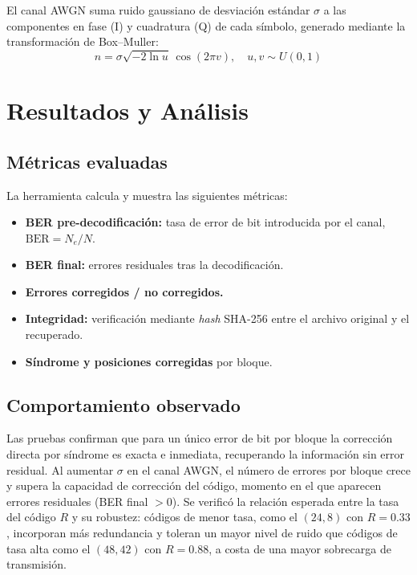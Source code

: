 \documentclass[conference]{IEEEtran}
\begin{document}
El canal AWGN suma ruido gaussiano de desviación estándar $\sigma$ a las componentes en fase (I) y cuadratura (Q) de cada símbolo, generado mediante la transformación de Box--Muller:
\begin{equation}
n = \sigma \sqrt{-2\ln u}\,\cos(2\pi v), \quad u,v \sim U(0,1)
\end{equation}

\section{Resultados y Análisis}

\subsection{Métricas evaluadas}
La herramienta calcula y muestra las siguientes métricas:
\begin{itemize}
  \item \textbf{BER pre-decodificación:} tasa de error de bit introducida por el canal, $\text{BER} = N_e / N$.
  \item \textbf{BER final:} errores residuales tras la decodificación.
  \item \textbf{Errores corregidos / no corregidos.}
  \item \textbf{Integridad:} verificación mediante \emph{hash} SHA-256 entre el archivo original y el recuperado.
  \item \textbf{Síndrome y posiciones corregidas} por bloque.
\end{itemize}

\subsection{Comportamiento observado}
Las pruebas confirman que para un único error de bit por bloque la corrección directa por síndrome es exacta e inmediata, recuperando la información sin error residual. Al aumentar $\sigma$ en el canal AWGN, el número de errores por bloque crece y supera la capacidad de corrección del código, momento en el que aparecen errores residuales (BER final $>0$). Se verificó la relación esperada entre la tasa del código $R$ y su robustez: códigos de menor tasa, como el $(24,8)$ con $R=0.33$, incorporan más redundancia y toleran un mayor nivel de ruido que códigos de tasa alta como el $(48,42)$ con $R=0.88$, a costa de una mayor sobrecarga de transmisión.
\end{document}
